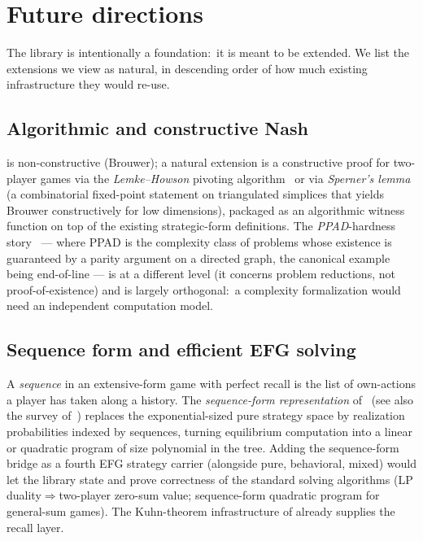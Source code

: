 \section{Future directions}
\label{sec:future}

The library is intentionally a foundation:\ it is meant to be
extended.  We list the extensions we view as natural, in
descending order of how much existing infrastructure they would
re-use.

\subsection{Algorithmic and constructive Nash}
\label{sec:future:algo}

 is non-constructive (Brouwer); a natural
extension is a constructive proof for two-player games via the
\emph{Lemke–Howson} pivoting algorithm~\citep{LemkeHowson1964} or
via \emph{Sperner's lemma}~\citep{Sperner1928} (a combinatorial
fixed-point statement on triangulated simplices that yields
Brouwer constructively for low dimensions), packaged as an
algorithmic witness function on top of the existing strategic-form
definitions.  The \emph{PPAD}-hardness
story~\citep{DaskalakisGoldbergPapadimitriou2009} — where PPAD is
the complexity class of problems whose existence is guaranteed by
a parity argument on a directed graph, the canonical example being
end-of-line — is at a different level (it concerns problem
reductions, not proof-of-existence) and is largely orthogonal:\ a
complexity formalization would need an independent computation
model.

\subsection{Sequence form and efficient EFG solving}
\label{sec:future:sequence-form}

A \emph{sequence} in an extensive-form game with perfect recall is
the list of own-actions a player has taken along a history.  The
\emph{sequence-form representation}
of~\citet{KollerMegiddoVonStengel1994} (see also the survey
of~\citet{vonStengel2002}) replaces the exponential-sized pure
strategy space by realization probabilities indexed by sequences,
turning equilibrium computation into a linear or quadratic
program of size polynomial in the tree.  Adding the sequence-form bridge as a fourth EFG
strategy carrier (alongside pure, behavioral, mixed) would let
the library state and prove correctness of the standard solving
algorithms (LP duality$\Rightarrow$two-player zero-sum value;
sequence-form quadratic program for general-sum games).  The
Kuhn-theorem infrastructure of  already
supplies the recall layer.

